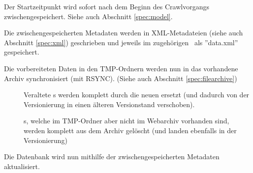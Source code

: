 \begin{description}
		Der Startzeitpunkt wird sofort nach dem Beginn des Crawlvorgangs zwischengespeichert.
		Siehe auch Abschnitt \ref{spec:model}.
	\item [\req{Erzeugung von XML-Dateien}{xml}]
		Die zwischengespeicherten Metadaten werden in XML-Metadateien 
		(siehe auch Abschnitt \ref{spec:xml}) 
		geschrieben und jeweils im zugehörigen \arc\ als ''data.xml'' gespeichert. 
	\item [\req{Synchronisation}{sync}]
		Die vorbereiteten Daten in den TMP-Ordnern werden nun in das vorhandene Archiv synchronisiert 
		(mit RSYNC). (Siehe auch Abschnitt \ref{spec:filearchive})
		\begin{description}
			\item []
				Veraltete \arc s werden komplett durch die neuen ersetzt
				(und dadurch von der Versionierung in einen älteren Versionstand verschoben).
			\item []
				\arc s, welche im TMP-Ordner aber nicht im Webarchiv vorhanden sind, werden
				komplett aus dem Archiv gelöscht (und landen ebenfalls in der Versionierung)
		\end{description}
	\item [\req{Datenbankaktualisierung}{dbupdate}]
		Die Datenbank wird nun mithilfe der zwischengespeicherten Metadaten aktualisiert.
\end{description}

